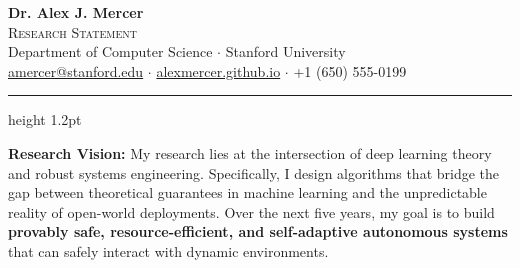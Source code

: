 \documentclass[10pt,a4paper]{article}
\begin{document}
\begin{center}
  {\fontsize{24pt}{28pt}\selectfont\color{accent}\bfseries Dr. Alex J. Mercer} \\
  \vspace{0.2em}
  {\fontsize{13pt}{16pt}\selectfont\scshape Research Statement} \\
  \vspace{0.4em}
  {\small \color{textgray} 
    Department of Computer Science $\cdot$ Stanford University \\
    \href{mailto:amercer@stanford.edu}{amercer@stanford.edu} $\cdot$ \href{https://alexmercer.github.io}{alexmercer.github.io} $\cdot$ +1 (650) 555-0199
  } \\
  \vspace{0.6em}
  \color{accent}\hrule height 1.2pt
\end{center}

\vspace{0.2em}

\begin{summarybox}
  \noindent\textbf{Research Vision:} My research lies at the intersection of deep learning theory and robust systems engineering. Specifically, I design algorithms that bridge the gap between theoretical guarantees in machine learning and the unpredictable reality of open-world deployments. Over the next five years, my goal is to build \textbf{provably safe, resource-efficient, and self-adaptive autonomous systems} that can safely interact with dynamic environments.
\end{summarybox}







\end{document}
